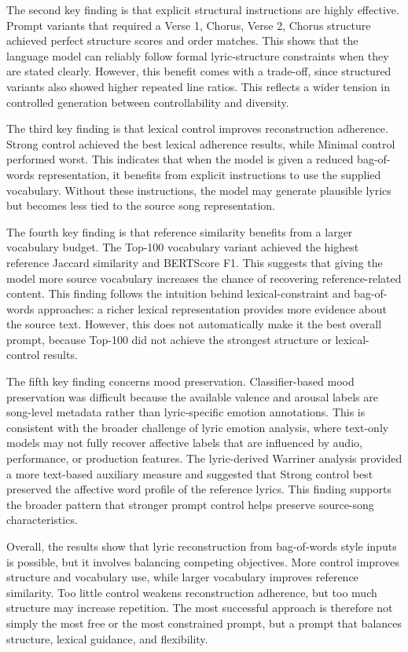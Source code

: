 The second key finding is that explicit structural instructions are highly effective. Prompt variants that required a Verse 1, Chorus, Verse 2, Chorus structure achieved perfect structure scores and order matches. This shows that the language model can reliably follow formal lyric-structure constraints when they are stated clearly. However, this benefit comes with a trade-off, since structured variants also showed higher repeated line ratios. This reflects a wider tension in controlled generation between controllability and diversity.

The third key finding is that lexical control improves reconstruction adherence. Strong control achieved the best lexical adherence results, while Minimal control performed worst. This indicates that when the model is given a reduced bag-of-words representation, it benefits from explicit instructions to use the supplied vocabulary. Without these instructions, the model may generate plausible lyrics but becomes less tied to the source song representation.

The fourth key finding is that reference similarity benefits from a larger vocabulary budget. The Top-100 vocabulary variant achieved the highest reference Jaccard similarity and BERTScore F1. This suggests that giving the model more source vocabulary increases the chance of recovering reference-related content. This finding follows the intuition behind lexical-constraint and bag-of-words approaches: a richer lexical representation provides more evidence about the source text. However, this does not automatically make it the best overall prompt, because Top-100 did not achieve the strongest structure or lexical-control results.

The fifth key finding concerns mood preservation. Classifier-based mood preservation was difficult because the available valence and arousal labels are song-level metadata rather than lyric-specific emotion annotations. This is consistent with the broader challenge of lyric emotion analysis, where text-only models may not fully recover affective labels that are influenced by audio, performance, or production features. The lyric-derived Warriner analysis provided a more text-based auxiliary measure and suggested that Strong control best preserved the affective word profile of the reference lyrics. This finding supports the broader pattern that stronger prompt control helps preserve source-song characteristics.

Overall, the results show that lyric reconstruction from bag-of-words style inputs is possible, but it involves balancing competing objectives. More control improves structure and vocabulary use, while larger vocabulary improves reference similarity. Too little control weakens reconstruction adherence, but too much structure may increase repetition. The most successful approach is therefore not simply the most free or the most constrained prompt, but a prompt that balances structure, lexical guidance, and flexibility.

